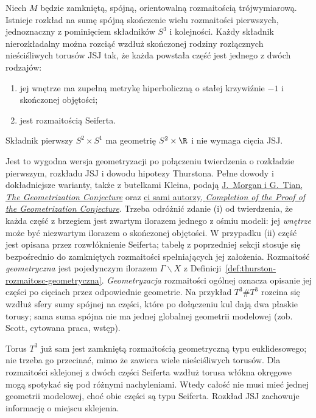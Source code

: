 \begin{twierdzenie}
\label{thm:thurston-geometrization}
Niech $M$ będzie zamkniętą, spójną, orientowalną
rozmaitością trójwymiarową. Istnieje rozkład na sumę spójną skończenie
wielu rozmaitości pierwszych, jednoznaczny z pominięciem
składników $S^3$ i kolejności. Każdy składnik
nierozkładalny można rozciąć wzdłuż skończonej rodziny
rozłącznych nieściśliwych torusów JSJ tak, że każda
powstała część jest jednego z dwóch rodzajów:
\begin{enumerate}[label=\textup{(\roman*)}]
\item jej wnętrze ma zupełną metrykę hiperboliczną
  o stałej krzywiźnie $-1$ i skończonej objętości;
\item jest rozmaitością Seiferta.
\end{enumerate}
Składnik pierwszy $S^2\times S^1$ ma geometrię
$S^2\times\R$ i nie wymaga cięcia JSJ.
\end{twierdzenie}

Jest to wygodna wersja geometryzacji po połączeniu
twierdzenia o rozkładzie pierwszym, rozkładu JSJ
i dowodu hipotezy Thurstona. Pełne dowody i dokładniejsze
warianty, także z butelkami Kleina, podają
\href{https://www.claymath.org/wp-content/uploads/2022/03/Geom.pdf}
{J.\ Morgan i G.\ Tian, \emph{The Geometrization Conjecture}}
oraz \href{https://arxiv.org/pdf/0809.4040}
{ci sami autorzy, \emph{Completion of the Proof of the
Geometrization Conjecture}}. Trzeba odróżnić zdanie (i)
od twierdzenia, że każda część z brzegiem jest zwartym
ilorazem jednego z ośmiu modeli: jej \emph{wnętrze}
może być niezwartym ilorazem o skończonej objętości.
W przypadku (ii) część jest opisana przez rozwłóknienie
Seiferta; tabelę z poprzedniej sekcji stosuje się bezpośrednio
do zamkniętych rozmaitości spełniających jej założenia.
Rozmaitość \emph{geometryczna} jest pojedynczym ilorazem
$\Gamma\backslash X$ z Definicji~\ref{def:thurston-rozmaitosc-geometryczna}.
\emph{Geometryzacja} rozmaitości ogólnej oznacza opisanie jej
części po cięciach przez odpowiednie geometrie. Na przykład
$T^3\#T^3$ rozcina się wzdłuż sfery sumy spójnej na części,
które po dołączeniu kul dają dwa płaskie torusy; sama suma
spójna nie ma jednej globalnej geometrii modelowej
(zob. Scott, cytowana praca, wstęp).

\begin{przyklad}
\label{prz:thurston-cut}
Torus $T^3$ już sam jest zamkniętą rozmaitością geometryczną
typu euklidesowego;
nie trzeba go przecinać, mimo że zawiera wiele nieściśliwych
torusów. Dla rozmaitości sklejonej z dwóch części Seiferta
wzdłuż torusa włókna okręgowe mogą spotykać się pod różnymi
nachyleniami. Wtedy całość nie musi mieć jednej geometrii
modelowej, choć obie części są typu Seiferta. Rozkład JSJ
zachowuje informację o miejscu sklejenia.
\end{przyklad}

